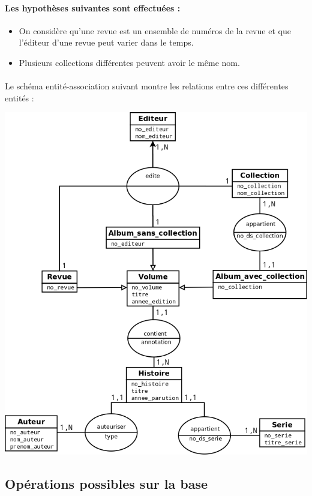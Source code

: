 \documentclass[12pt]{report}
\begin{document}
\paragraph{Les hypothèses suivantes sont effectuées :}
\begin{itemize}
	\item On considère qu'une revue est un ensemble de numéros de la revue et que
		l'éditeur d'une revue peut varier dans le temps.
	\item Plusieurs collections différentes peuvent avoir le même nom.
\end{itemize}

\paragraph{}
Le schéma entité-association suivant montre les relations entre ces
différentes entités :

\noindent\includegraphics[width=\textwidth]{schema-entite-association}

\subsection{Opérations possibles sur la base}
\end{document}
